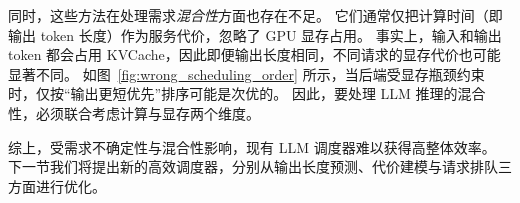 同时，这些方法在处理需求\emph{混合性}方面也存在不足。
它们通常仅把计算时间（即输出 token 长度）作为服务代价，忽略了 GPU 显存占用。
事实上，输入和输出 token 都会占用 KVCache，因此即便输出长度相同，不同请求的显存代价也可能显著不同。
如图~\ref{fig:wrong_scheduling_order} 所示，当后端受显存瓶颈约束时，仅按“输出更短优先”排序可能是次优的。
因此，要处理 LLM 推理的混合性，必须联合考虑计算与显存两个维度。

综上，受需求不确定性与混合性影响，现有 LLM 调度器难以获得高整体效率。
下一节我们将提出新的高效调度器，分别从输出长度预测、代价建模与请求排队三方面进行优化。
